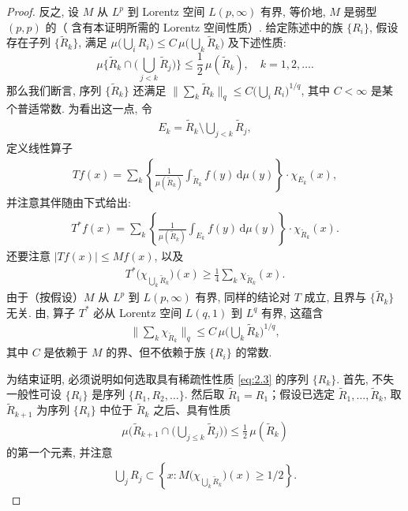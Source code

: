 \begin{proof}
反之, 设 $M$ 从 $L^p$ 到 Lorentz 空间 $L(p, \infty)$ 有界, 等价地, $M$ 是弱型 $(p, p)$ 的（\cite{b14} 含有本证明所需的 Lorentz 空间性质）. 给定陈述中的族 $\{R_i\}$, 假设存在子列 $\{\tilde{R}_k\}$, 满足 $\mu\bigl(\bigcup_i R_i\bigr) \leq C\,\mu\bigl(\bigcup_k \tilde{R}_k\bigr)$ 及下述性质:
\begin{equation}\label{eq:2.3}
  \mu\Big\{\tilde{R}_{k}\cap\Big(\bigcup_{j<k}\tilde{R}_{j}\Big)\Big\}\leq\frac{1}{2}\,\mu(\tilde{R}_{k}),\quad k=1,2,\ldots.
\end{equation}
那么我们断言, 序列 $\{\tilde{R}_k\}$ 还满足 $\bigl\|\sum_k \tilde{R}_k\bigr\|_q \leq C\bigl(\bigcup_i R_i\bigr)^{1/q}$, 其中 $C < \infty$ 是某个普适常数. 为看出这一点, 令
\begin{align*}
  E_{k}=\tilde{R}_{k}\setminus\bigcup_{j<k}\tilde{R}_{j},
\end{align*}
定义线性算子
\begin{align*}
  T f(x)=\sum_{k}\left\{\frac{1}{\mu(\tilde{R}_{k})}\int_{\tilde{R}_{k}}f(y)\,\mathrm{d}\mu(y)\right\}\cdot\chi_{E_{k}}(x),
\end{align*}
并注意其伴随由下式给出:
\begin{align*}
  T^{*}f(x)=\sum_{k}\left\{\frac{1}{\mu(\tilde{R}_{k})}\int_{E_{k}}f(y)\,\mathrm{d}\mu(y)\right\}\cdot\chi_{\tilde{R}_{k}}(x).
\end{align*}
还要注意 $|Tf(x)| \leq Mf(x)$, 以及
\begin{align*}
  T^{*}\bigl(\chi_{\bigcup_{k}\tilde{R}_{k}}\bigr)(x)\geq\frac{1}{4}\sum_{k}\chi_{\tilde{R}_{k}}(x).
\end{align*}
由于（按假设）$M$ 从 $L^p$ 到 $L(p, \infty)$ 有界, 同样的结论对 $T$ 成立, 且界与 $\{\tilde{R}_k\}$ 无关. 由, 算子 $T^*$ 必从 Lorentz 空间 $L(q,1)$ 到 $L^{q}$ 有界, 这蕴含
\begin{align*}
  \Big\|\sum_{k}\chi_{\tilde{R}_{k}}\Big\|_{q}\leq C\,\mu\Big(\bigcup_{k}\tilde{R}_{k}\Big)^{1/q},
\end{align*}
其中 $C$ 是依赖于 $M$ 的界、但不依赖于族 $\{R_{i}\}$ 的常数.

为结束证明, 必须说明如何选取具有稀疏性性质 \eqref{eq:2.3} 的序列 $\{R_k\}$. 首先, 不失一般性可设 $\{R_i\}$ 是序列 $\{R_1, R_2, \ldots\}$. 然后取 $\tilde{R}_1 = R_1$；假设已选定 $\tilde{R}_1, \ldots, \tilde{R}_k$, 取 $\tilde{R}_{k+1}$ 为序列 $\{R_i\}$ 中位于 $\tilde{R}_k$ 之后、具有性质
\begin{align*}
  \mu\Big(\tilde{R}_{k+1}\cap\Big(\bigcup_{j\leq k}\tilde{R}_{j}\Big)\Big)\leq\frac{1}{2}\,\mu(\tilde{R}_{k})
\end{align*}
的第一个元素, 并注意
\begin{align*}
  \bigcup_{j}R_{j}\subset\left\{x:M\bigl(\chi_{\bigcup_{k}\tilde{R}_{k}}\bigr)(x)\geq 1/2\right\}.
\end{align*}
\end{proof}

